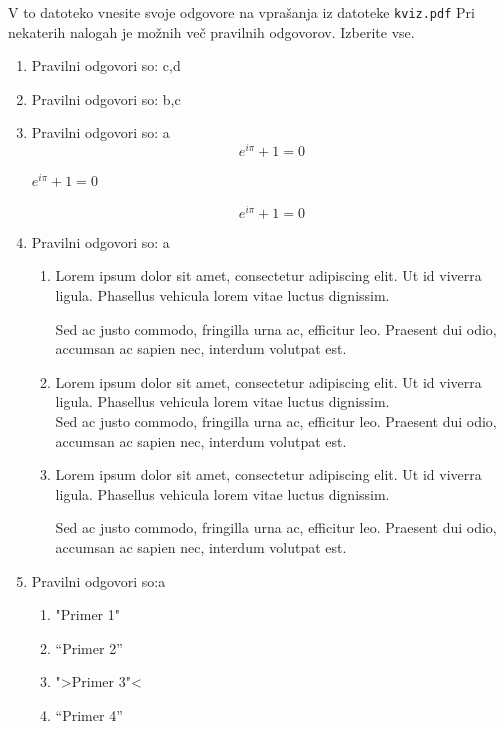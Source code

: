 \documentclass[11pt]{article}
\begin{document}
V to datoteko vnesite svoje odgovore na vprašanja iz datoteke \texttt{kviz.pdf}
Pri nekaterih nalogah je možnih več pravilnih odgovorov. Izberite vse.

\begin{enumerate}
    \item Pravilni odgovori so: c,d%
    
    \item Pravilni odgovori so: b,c%
    
    \item Pravilni odgovori so: a  %
      \[ e^{i \pi} + 1 = 0 \]
      \begin{center}
          \( e^{i \pi} + 1 = 0 \)
      \end{center}
      \begin{equation*}
          e^{i \pi} + 1 = 0
      \end{equation*}

    \item Pravilni odgovori so: a %
        \begin{enumerate}
            \item {
Lorem ipsum dolor sit amet, consectetur adipiscing 
elit. Ut id viverra ligula. Phasellus vehicula lorem 
vitae luctus dignissim. 
                
Sed ac justo commodo, fringilla urna ac, efficitur 
leo. Praesent dui odio, accumsan ac sapien nec, 
interdum volutpat est. 
            }
            \item {
Lorem ipsum dolor sit amet, consectetur adipiscing 
elit. Ut id viverra ligula. Phasellus vehicula lorem 
vitae luctus dignissim. \\
Sed ac justo commodo, fringilla urna ac, efficitur 
leo. Praesent dui odio, accumsan ac sapien nec, 
interdum volutpat est.             }
            \item {
Lorem ipsum dolor sit amet, consectetur adipiscing 
elit. Ut id viverra ligula. Phasellus vehicula lorem 
vitae luctus dignissim. \par
Sed ac justo commodo, fringilla urna ac, efficitur 
leo. Praesent dui odio, accumsan ac sapien nec, 
interdum volutpat est.             }
        \end{enumerate}
    
      \item Pravilni odgovori so:a %
        \begin{enumerate}
          \item "Primer 1"
          \item ``Primer 2''
          \item ">Primer 3"<
          \item "`Primer 4"'
        \end{enumerate}


\end{enumerate}
\end{document}
